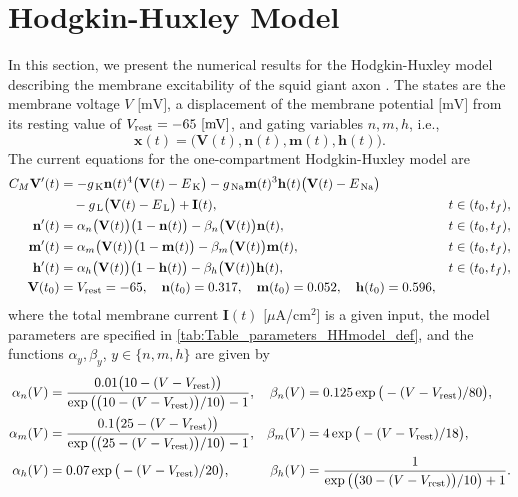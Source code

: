 \documentclass[onefignum,onetabnum]{siamart220329}
\numberwithin{equation}{section}
\newcommand{\bh}{\ensuremath{\mathbf{h}}} %
\newcommand{\bm}{\ensuremath{\mathbf{m}}} %
\newcommand{\bn}{\ensuremath{\mathbf{n}}} %
\newcommand{\bx}{\ensuremath{\mathbf{x}}} %
\newcommand{\BI}{\ensuremath{\mathbf{I}} } %
\newcommand{\BV}{\ensuremath{\mathbf{V}} } %
\begin{document}
% 
\section{Hodgkin-Huxley Model} \label{sec:numerics_hh}
In this section, we present the numerical results for the Hodgkin-Huxley model describing the membrane excitability of the squid giant axon 
 \cite{ALHodgkin_AFHuxley_1952a}.
The states are the membrane voltage $V \textrm{ [mV]}$,
a displacement of the membrane potential $\textrm{[mV]}$  from its resting value of $V_{\rm rest}  = -65 \textrm{ [mV]}$,
and gating variables $n, m, h$, i.e.,
\[
	\bx(t) = \big( \BV(t), \bn(t), \bm(t), \bh(t) \big).
\]
The current equations for the one-compartment Hodgkin-Huxley model are
\begin{subequations} \label{eq:HH_model}
    \begin{align}
            C_M \BV'(t) &= -g_\textrm{ \!K} \bn(t)^4 \big(\BV(t) - E_\textrm{ \!K}\big) - g_{\textrm{ \!Na}} \bm(t)^3 \bh(t) \big(\BV(t) - E_{\textrm{ \!Na}} \big) \nonumber \\
            &\quad - g_\textrm{ \!L} \big(\BV(t) - E_\textrm{ \!L} \big) + \BI(t), & t \in (t_0, t_f), \\
        \bn'(t) &= \alpha_n\big(\BV(t)\big)\big(1-\bn(t)\big)-\beta_n\big(\BV(t)\big) \bn(t), & t \in (t_0, t_f), \label{eq:n_equation} \\
        \bm'(t) &= \alpha_m\big(\BV(t)\big)\big(1-\bm(t)\big)-\beta_m\big(\BV(t)\big) \bm(t), & t \in (t_0, t_f), \label{eq:m_equation} \\
        \bh'(t) &= \alpha_h\big(\BV(t)\big)\big(1-\bh(t)\big)-\beta_h\big(\BV(t)\big) \bh(t), & t \in (t_0, t_f), \label{eq:h_equation} \\
        \BV(t_0) &= V_{\rm rest}  = -65, \quad
        \bn(t_0) = 0.317, \quad
        \bm(t_0) = 0.052, \quad
        \bh(t_0) = 0.596,
    \end{align}
\end{subequations}
where the total membrane current $\BI(t)$ $[\mu$A/cm$^2$] is a given input, 
the model parameters are specified in \cref{tab:Table_parameters_HHmodel_def}, and the
functions $\alpha_y, \beta_y$, $y \in \{ n, m, h\}$ are given by
\begin{subequations}    \label{eq:HH_model-alpha-beta}
    \begin{align}
        \alpha_n(V)&=\frac{0.01\big( 10 - (V - V_{\rm rest}) \big)}{\exp\big( \big( 10 - (V - V_{\rm rest}) \big)/10\big) - 1}, &
         \beta_n(V)&=0.125\exp\big( -(V - V_{\rm rest})/80\big),\\
        \alpha_m(V)&=\frac{0.1\big(25-(V - V_{\rm rest})\big)}{\exp\big(\big(25-(V - V_{\rm rest})\big)/10 \big) - 1}, &
        \beta_m(V)&=4\exp\big( -(V - V_{\rm rest}) /18\big),\\
        \alpha_h(V)&=0.07\exp\big(- (V - V_{\rm rest})/20\big), &
        \beta_h(V)&= \frac{1}{\exp\big(\big(30 - (V - V_{\rm rest}) \big)/10\big) + 1 }.
     \end{align}
\end{subequations}
\end{document}
